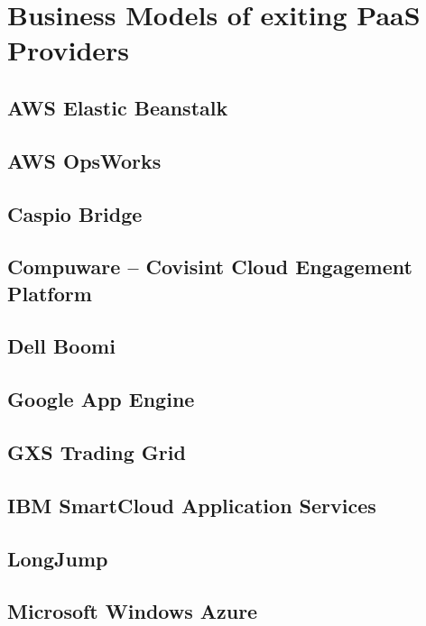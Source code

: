 \chapter{Business Models of exiting PaaS Providers}\label{ch:app01}

\section{AWS Elastic Beanstalk}

\section{AWS OpsWorks}

\section{Caspio Bridge}

\section{Compuware -- Covisint Cloud Engagement Platform}

\section{Dell Boomi}

\section{Google App Engine}

\section{GXS Trading Grid}

\section{IBM SmartCloud Application Services}

\section{LongJump}

\section{Microsoft Windows Azure}

